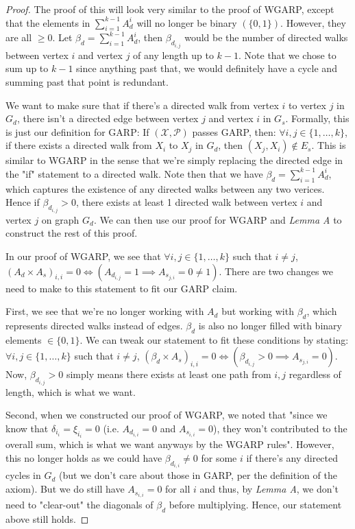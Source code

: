 \documentclass{article} %
\begin{document}
\begin{proof}
The proof of this will look very similar to the proof of WGARP, except that the elements in $\sum_{i=1}^{k-1}A_{d}^{i}$ will no longer be binary $(\{0,1\})$. However, they are all $\geq0$. Let $\beta_d=\sum_{i=1}^{k-1}A_{d}^{i}$, then $\beta_{d_{i,j}}$ would be the number of directed walks between vertex $i$ and vertex $j$ of any length up to $k-1$. Note that we chose to sum up to $k-1$ since anything past that, we would definitely have a cycle and summing past that point is redundant.


We want to make sure that if there's a directed walk from vertex $i$ to vertex $j$ in $G_d$, there isn't a directed edge between vertex $j$ and vertex $i$ in $G_s$. Formally, this is just our definition for GARP: If $(\mathcal{X},\mathcal{P})$ passes GARP, then: $\forall i,j\in\{1,\dots,k\}$, if there exists a directed walk from $X_i$ to $X_j$ in $G_d$, then $(X_j,X_i)\not\in E_s$. This is similar to WGARP in the sense that we're simply replacing the directed edge in the "if" statement to a directed walk. Note then that we have $\beta_d=\sum_{i=1}^{k-1}A_{d}^{i}$, which captures the existence of any directed walks between any two verices. Hence if $\beta_{d_{i,j}}>0$, there exists at least 1 directed walk between vertex $i$ and vertex $j$ on graph $G_d$. We can then use our proof for WGARP and \textit{Lemma A} to construct the rest of this proof.


In our proof of WGARP, we see that $\forall i, j\in\{1,\ldots,k\}$ such that $i\not=j$, $(A_d\times A_s)_{i,i}=0 \iff (A_{d_{i,j}}=1 \implies A_{s_{j,i}}=0\not=1)$. There are two changes we need to make to this statement to fit our GARP claim. 

First, we see that we're no longer working with $A_d$ but working with $\beta_d$, which represents directed walks instead of edges. $\beta_d$ is also no longer filled with binary elements $\in\{0,1\}$. We can tweak our statement to fit these conditions by stating: $\forall i, j\in\{1,\ldots,k\}$ such that $i\not=j$, $(\beta_d\times A_s)_{i,i}=0 \iff (\beta_{d_{i,j}}>0 \implies A_{s_{j,i}}=0)$. Now, $\beta_{d_{i,j}}>0$ simply means there exists at least one path from $i,j$ regardless of length, which is what we want.

Second, when we constructed our proof of WGARP, we noted that "since we know that $\delta_{i_i}=\xi_{i_i}=0$ (i.e. $A_{d_{i,i}}=0$ and $A_{s_{i,i}}=0$), they won't contributed to the overall sum, which is what we want anyways by the WGARP rules". However, this no longer holds as we could have $\beta_{d_{i,i}}\not=0$ for some $i$ if there's any directed cycles in $G_d$ (but we don't care about those in GARP, per the definition of the axiom). But we do still have $A_{s_{i,i}}=0$ for all $i$ and thus, by \textit{Lemma A}, we don't need to "clear-out" the diagonals of $\beta_d$ before multiplying. Hence, our statement above still holds. 


\end{proof}
\end{document}
